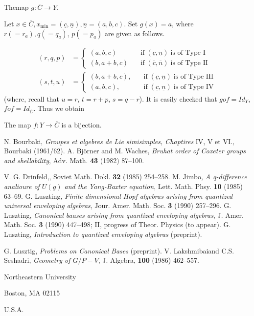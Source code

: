 \subsection{}\label{chap9-subsec-8.4}
 The\pageoriginale map $g : \overline{C} \longrightarrow Y$.

 Let $x \in \overline{C}, x_{\min}= (\underline{c}, \underline{n}), \underline{n} =(a,b,c)$. Set $g(x) = a$, where $r(=r_{a}), q(=q_{a})$, $p(=p_{a})$ are given as follows.

 \begin{align*}
(r, q,p)&=
 \begin{cases}
(a,b,c) \quad &\text{if} \; (\underline{c}, \underline{n})\; \text{is of Type I}\\
(b,a+b,c)\quad &\text{if} \; (\overline{c}, \overline{n})\; \text{is of Type II}
 \end{cases}\\
 (s,t,u)&=
 \begin{cases}
(b,a+b,c), \quad &\text{if} \; (\underline{c}, \underline{n})\; \text{is of Type III}\\
(a,b,c), \quad &\text{if} \; (\underline{c}, \underline{n})\; \text{is of Type IV}
 \end{cases}
 \end{align*}
(where, recall that $u=r$, $t=r + p$, $s=q-r$). It is easily checked that  $gof =Id_{Y}$, $fof=Id_{\overline{C}}$.
Thus we obtain

\setcounter{theorem}{4}
\begin{theorem}
The map $f: Y \longrightarrow \overline{C}$ is a bijection.
\end{theorem}

\begin{thebibliography}{99}
 N. Bourbaki, \textit{Groupes et algebres de Lie simisimples, Chaptires} IV, V et VI., Bourbaki (1961/62).
A. Bj\"orner and M. Waches, \textit{Bruhat order of Coxeter groups and shellability}, Adv. Math. {\bf 43} (1982) 87--100.

 V. G. Drinfeld,, Soviet Math. Dokl. {\bf 32} (1985) 254--258. 
 M. Jimbo, \textit{A q-difference analioure of $U(g)$ and the Yang-Baxter equation}, Lett. Math. Phsy. {\bf 10} (1985) 63--69.
G. Luszting, \textit{Finite dimensional Hopf algebras arising from quantized universal enveloping algebras}, Jour. Amer. Math. Soc. {\bf 3} (1990) 257--296.
 G. Luszting, \textit{Canonical baases arising from quantized enveloping algebras}, J. Amer. Math. Soc. {\bf 3} (1990) 447--498; II, progress of Theor. Physics (to appear).
 G. Luszting, \textit{Introduction to quantized enveloping algebras} (preprint).

 G. Lusztig, \textit{Problems on Canonical Bases} (preprint).
V. Lakshmibai\pageoriginale and C.S. Seshadri, \textit{Geometry of $G/P-V$}, J. Algebra, {\bf 100} (1986) 462--557.
\end{thebibliography}

\bigskip

\begin{flushleft}
Northeastern University

Boston, MA 02115

U.S.A.
\end{flushleft}
